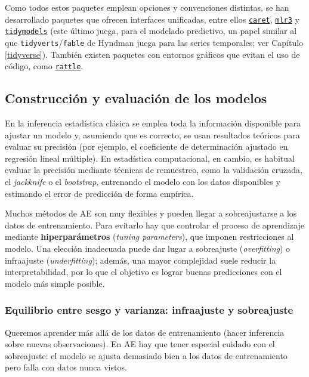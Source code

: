 \documentclass[
]{book}
\theoremstyle{break}
\theoremstyle{nonumberplain}
\begin{document}
Como todos estos paquetes emplean opciones y convenciones distintas, se han desarrollado paquetes que ofrecen interfaces unificadas, entre ellos \href{https://topepo.github.io/caret}{\texttt{caret}}, \href{https://mlr3.mlr-org.com}{\texttt{mlr3}} y \href{https://www.tidymodels.org}{\texttt{tidymodels}} (este último juega, para el modelado predictivo, un papel similar al que \texttt{tidyverts}/\texttt{fable} de Hyndman juega para las series temporales; ver Capítulo \ref{tidyverse}). También existen paquetes con entornos gráficos que evitan el uso de código, como \href{https://rattle.togaware.com}{\texttt{rattle}}.

\subsection{Construcción y evaluación de los modelos}\label{const-eval}

En la inferencia estadística clásica se emplea toda la información disponible para ajustar un modelo y, asumiendo que es correcto, se usan resultados teóricos para evaluar su precisión (por ejemplo, el coeficiente de determinación ajustado en regresión lineal múltiple). En estadística computacional, en cambio, es habitual evaluar la precisión mediante técnicas de remuestreo, como la validación cruzada, el \emph{jackknife} o el \emph{bootstrap}, entrenando el modelo con los datos disponibles y estimando el error de predicción de forma empírica.

Muchos métodos de AE son muy flexibles y pueden llegar a sobreajustarse a los datos de entrenamiento. Para evitarlo hay que controlar el proceso de aprendizaje mediante \textbf{hiperparámetros} (\emph{tuning parameters}), que imponen restricciones al modelo. Una elección inadecuada puede dar lugar a sobreajuste (\emph{overfitting}) o infraajuste (\emph{underfitting}); además, una mayor complejidad suele reducir la interpretabilidad, por lo que el objetivo es lograr buenas predicciones con el modelo más simple posible.

\subsubsection{Equilibrio entre sesgo y varianza: infraajuste y sobreajuste}\label{bias-variance}

Queremos aprender más allá de los datos de entrenamiento (hacer inferencia sobre nuevas observaciones). En AE hay que tener especial cuidado con el sobreajuste: el modelo se ajusta demasiado bien a los datos de entrenamiento pero falla con datos nunca vistos.
\end{document}
